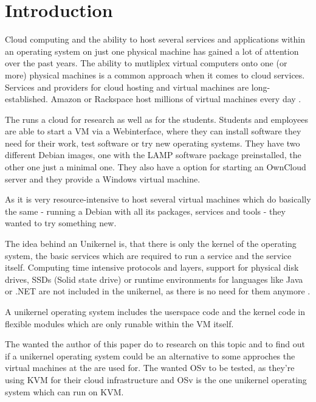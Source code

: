 \chapter{Introduction}

    Cloud computing and the ability to host several services and
    applications within an operating system on just one physical machine has
    gained a lot of attention over the past years. The ability to mutliplex
    virtual computers onto one (or more) physical machines is a common approach
    when it comes to cloud services. Services and providers for cloud hosting
    and virtual machines are long-established. Amazon or Rackspace host millions
    of virtual machines every day \cite[S. 1]{unikernels}.

    The \HFU{} runs a cloud for research as well as for the students. Students
    and employees are able to start a VM via a Webinterface, where they can
    install software they need for their work, test software or try new
    operating systems. They have two different Debian images, one with the LAMP
    software package preinstalled, the other one just a minimal one. They also
    have a option for starting an OwnCloud server and they provide a Windows
    virtual machine.

    As it is very resource-intensive to host several virtual machines which do
    basically the same - running a Debian with all its packages, services and
    tools - they wanted to try something new.

    The idea behind an Unikernel is, that there is only the kernel of the
    operating system, the basic services which are required to run a service and
    the service itself. Computing time intensive protocols and layers, support
    for physical disk drives, SSDs (Solid state drive) or runtime environments
    for languages like Java or .NET are not included in the unikernel, as there
    is no need for them anymore \cite[S. 1]{unikernels}.

    A unikernel operating system includes the userspace code and the kernel code
    in flexible modules which are only runable within the VM itself.

    The \HFU wanted the author of this paper do to research on this topic and to
    find out if a unikernel operating system could be an alternative to some
    approches the virtual machines at the \HFU are used for. The \HFU wanted OSv
    to be tested, as they're using KVM for their cloud infrastructure and OSv is
    the one unikernel operating system which can run on KVM.
